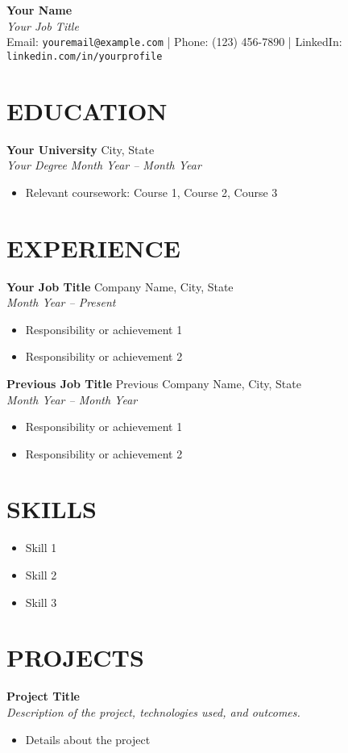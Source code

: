\documentclass[a4paper,10pt]{article}
\newcommand{\resumeSection}[1]{
    \section*{\uppercase{#1}}
}
\newcommand{\resumeSubheading}[4]{
    \textbf{#1} \hfill #2 \\
    \textit{#3} \hfill \textit{#4} \\
}
\newcommand{\resumeItem}[1]{
    \item{#1}
}
\newcommand{\resumeListStart}{
    \begin{itemize}[left=0em]
}
\newcommand{\resumeListEnd}{
    \end{itemize}
}
\begin{document}
\pagestyle{empty}

\begin{center}
    \textbf{\Huge Your Name} \\
    \vspace{0.2em}
    \textit{Your Job Title} \\
    \vspace{0.5em}
    Email: \texttt{youremail@example.com} | Phone: (123) 456-7890 | LinkedIn: \texttt{linkedin.com/in/yourprofile}
\end{center}

\resumeSection{Education}
\resumeSubheading
    {Your University}{City, State}
    {Your Degree}{Month Year -- Month Year}
    \resumeListStart
        \resumeItem{Relevant coursework: Course 1, Course 2, Course 3}
    \resumeListEnd

\resumeSection{Experience}
\resumeSubheading
    {Your Job Title}{Company Name, City, State}
    {Month Year -- Present}{}
    \resumeListStart
        \resumeItem{Responsibility or achievement 1}
        \resumeItem{Responsibility or achievement 2}
    \resumeListEnd

\resumeSubheading
    {Previous Job Title}{Previous Company Name, City, State}
    {Month Year -- Month Year}{}
    \resumeListStart
        \resumeItem{Responsibility or achievement 1}
        \resumeItem{Responsibility or achievement 2}
    \resumeListEnd

\resumeSection{Skills}
\resumeListStart
    \resumeItem{Skill 1}
    \resumeItem{Skill 2}
    \resumeItem{Skill 3}
\resumeListEnd

\resumeSection{Projects}
\resumeSubheading
    {Project Title}{}
    {Description of the project, technologies used, and outcomes.}{}
    \resumeListStart
        \resumeItem{Details about the project}
    \resumeListEnd
\end{document}
